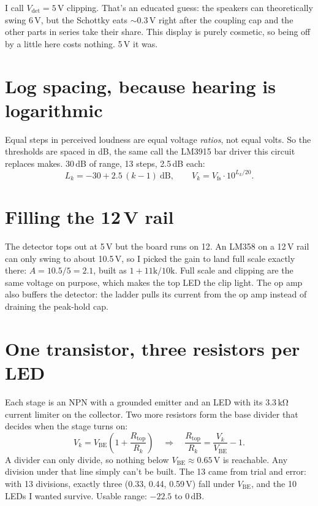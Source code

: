 \documentclass[11pt]{article}
\newcommand{\Vdet}{V_{\mathrm{det}}}
\newcommand{\Vbe}{V_{\mathrm{BE}}}
\newcommand{\Rtop}{R_{\mathrm{top}}}
\newcommand{\kO}{\,\mathrm{k\Omega}}
\begin{document}
I call $\Vdet = 5$\,V clipping. That's an educated guess: the speakers can
theoretically swing 6\,V, but the Schottky eats $\sim$0.3\,V right after the
coupling cap and the other parts in series take their share. This display is
purely cosmetic, so being off by a little here costs nothing. 5\,V it was.

\section*{Log spacing, because hearing is logarithmic}

Equal steps in perceived loudness are equal voltage \emph{ratios}, not equal
volts. So the thresholds are spaced in dB, the same call the LM3915 bar
driver this circuit replaces makes. 30\,dB of range, 13 steps, 2.5\,dB each:
\begin{equation}
L_k = -30 + 2.5\,(k-1)\ \mathrm{dB}, \qquad
V_k = V_{\mathrm{fs}} \cdot 10^{L_k/20}.
\end{equation}

\section*{Filling the 12\,V rail}

The detector tops out at 5\,V but the board runs on 12. An LM358 on a 12\,V
rail can only swing to about 10.5\,V, so I picked the gain to land full scale
exactly there: $A = 10.5/5 = 2.1$, built as $1 + 11\mathrm{k}/10\mathrm{k}$.
Full scale and clipping are the same voltage on purpose, which makes the top
LED the clip light. The op amp also buffers the detector: the ladder pulls
its current from the op amp instead of draining the peak-hold cap.

\section*{One transistor, three resistors per LED}

Each stage is an NPN with a grounded emitter and an LED with its $3.3\kO$
current limiter on the collector. Two more resistors form the base divider
that decides when the stage turns on:
\begin{equation}
V_k = \Vbe\left(1 + \frac{\Rtop}{R_k}\right)
\quad\Longrightarrow\quad
\frac{\Rtop}{R_k} = \frac{V_k}{\Vbe} - 1.
\label{eq:rk}
\end{equation}
A divider can only divide, so nothing below $\Vbe \approx 0.65$\,V is
reachable. Any division under that line simply can't be built. The 13 came
from trial and error: with 13 divisions, exactly three (0.33, 0.44,
0.59\,V) fall under $\Vbe$, and the 10 LEDs I wanted survive. Usable range:
$-22.5$ to 0\,dB.
\end{document}

